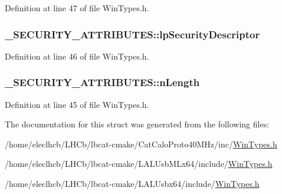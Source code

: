 Definition at line 47 of file WinTypes.h.\hypertarget{struct__SECURITY__ATTRIBUTES_a90d1d49f7d2d50b24cc74c5060ae6204}{
\subsubsection[{lpSecurityDescriptor}]{ {\bf \_\-SECURITY\_\-ATTRIBUTES::lpSecurityDescriptor}}}
\label{struct__SECURITY__ATTRIBUTES_a90d1d49f7d2d50b24cc74c5060ae6204}


Definition at line 46 of file WinTypes.h.\hypertarget{struct__SECURITY__ATTRIBUTES_a3ec25c40b65a92b164177b0b230abda9}{
\subsubsection[{nLength}]{ {\bf \_\-SECURITY\_\-ATTRIBUTES::nLength}}}
\label{struct__SECURITY__ATTRIBUTES_a3ec25c40b65a92b164177b0b230abda9}


Definition at line 45 of file WinTypes.h.

The documentation for this struct was generated from the following files:\begin{DoxyCompactItemize}
\item 
/home/eleclhcb/LHCb/lbcat-\/cmake/CatCaloProto40MHz/inc/\hyperlink{CatCaloProto40MHz_2inc_2WinTypes_8h}{WinTypes.h}\item 
/home/eleclhcb/LHCb/lbcat-\/cmake/LALUsbMLx64/include/\hyperlink{LALUsbMLx64_2include_2WinTypes_8h}{WinTypes.h}\item 
/home/eleclhcb/LHCb/lbcat-\/cmake/LALUsbx64/include/\hyperlink{LALUsbx64_2include_2WinTypes_8h}{WinTypes.h}\end{DoxyCompactItemize}
